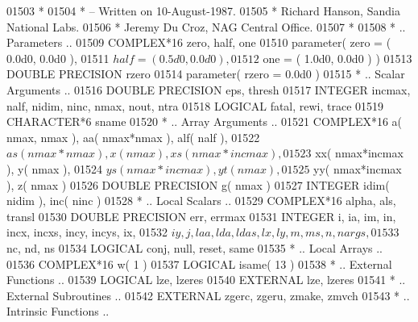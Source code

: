 \begin{DoxyCode}
01503 \textcolor{comment}{*}
01504 \textcolor{comment}{*  -- Written on 10-August-1987.}
01505 \textcolor{comment}{*     Richard Hanson, Sandia National Labs.}
01506 \textcolor{comment}{*     Jeremy Du Croz, NAG Central Office.}
01507 \textcolor{comment}{*}
01508 \textcolor{comment}{*     .. Parameters ..}
01509       \textcolor{keywordtype}{COMPLEX*16}         zero, half, one
01510       parameter( zero = ( 0.0d0, 0.0d0 ),
01511      $                   half = ( 0.5d0, 0.0d0 ),
01512      $                   one = ( 1.0d0, 0.0d0 ) )
01513       \textcolor{keywordtype}{DOUBLE PRECISION}   rzero
01514       parameter( rzero = 0.0d0 )
01515 \textcolor{comment}{*     .. Scalar Arguments ..}
01516       \textcolor{keywordtype}{DOUBLE PRECISION}   eps, thresh
01517       \textcolor{keywordtype}{INTEGER}            incmax, nalf, nidim, ninc, nmax, nout, ntra
01518       \textcolor{keywordtype}{LOGICAL}            fatal, rewi, trace
01519       \textcolor{keywordtype}{CHARACTER*6}        sname
01520 \textcolor{comment}{*     .. Array Arguments ..}
01521       \textcolor{keywordtype}{COMPLEX*16}         a( nmax, nmax ), aa( nmax*nmax ), alf( nalf ),
01522      $                   as( nmax*nmax ), x( nmax ), xs( nmax*incmax ),
01523      $                   xx( nmax*incmax ), y( nmax ),
01524      $                   ys( nmax*incmax ), yt( nmax ),
01525      $                   yy( nmax*incmax ), z( nmax )
01526       \textcolor{keywordtype}{DOUBLE PRECISION}   g( nmax )
01527       \textcolor{keywordtype}{INTEGER}            idim( nidim ), inc( ninc )
01528 \textcolor{comment}{*     .. Local Scalars ..}
01529       \textcolor{keywordtype}{COMPLEX*16}         alpha, als, transl
01530       \textcolor{keywordtype}{DOUBLE PRECISION}   err, errmax
01531       \textcolor{keywordtype}{INTEGER}            i, ia, im, in, incx, incxs, incy, incys, ix,
01532      $                   iy, j, laa, lda, ldas, lx, ly, m, ms, n, nargs,
01533      $                   nc, nd, ns
01534       \textcolor{keywordtype}{LOGICAL}            conj, null, reset, same
01535 \textcolor{comment}{*     .. Local Arrays ..}
01536       \textcolor{keywordtype}{COMPLEX*16}         w( 1 )
01537       \textcolor{keywordtype}{LOGICAL}            isame( 13 )
01538 \textcolor{comment}{*     .. External Functions ..}
01539       \textcolor{keywordtype}{LOGICAL}            lze, lzeres
01540       \textcolor{keywordtype}{EXTERNAL}           lze, lzeres
01541 \textcolor{comment}{*     .. External Subroutines ..}
01542       \textcolor{keywordtype}{EXTERNAL}           zgerc, zgeru, zmake, zmvch
01543 \textcolor{comment}{*     .. Intrinsic Functions ..}

\end{DoxyCode}
